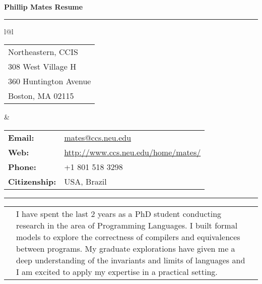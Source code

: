 \documentclass[10pt]{article}
\makeatletter
\newcommand{\category}[2]{
\begin{center}
\vskip 6pt
\begin{tabular*}{\textwidth}{@{}p{0.75in}@{\quad\;\;}p{4in}@{\quad\quad}p{0.7in}}
\vcrush[t]{1in}{\textsc{#1}} &
#2
\end{tabular*}
\end{center}
}
\makeatother
\begin{document}


{\LARGE \bf \sc
\noindent Phillip Mates\hspace{\stretch 1}
Resume
}
\vskip 10pt
\hrule


\begin{center}
\vskip -5pt
\begin{tabular*}{\textwidth}{l@{\extracolsep{\fill}}l}

\begin{tabular}[t]{l}
Northeastern, CCIS\\
308 West Village H \\
360 Huntington Avenue \\
Boston, MA 02115\\

\end{tabular} &

\begin{tabular}[t]{ll}
{\small\bf Email:} & {\small \url{mates@ccs.neu.edu}}\\
{\small\bf Web:} & {\small \url{http://www.ccs.neu.edu/home/mates/}}\\
{\small\bf Phone:} & {\small +1 801 518 3298} \\
{\small\bf Citizenship:} & {\small USA, Brazil}
\end{tabular}

\end{tabular*}
\end{center}

\vskip -6pt
\hrule




\category{Statement}{
  I have spent the last 2 years as a PhD student conducting research in the area of Programming Languages.
  I built formal models to explore the correctness of compilers and equivalences between programs.
  My graduate explorations have given me a deep understanding of the invariants and limits of languages and I am excited to apply my expertise in a practical setting.}
\end{document}
